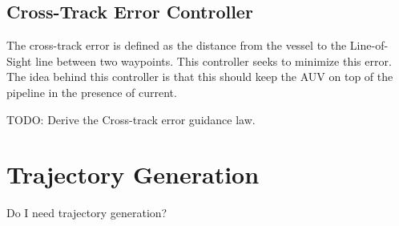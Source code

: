 	\subsection{Cross-Track Error Controller}
		The cross-track error is defined as the distance from the vessel to the Line-of-Sight line between two waypoints. This controller seeks to minimize this error. The idea behind this controller is that this should keep the AUV on top of the pipeline in the presence of current.
		
		TODO: Derive the Cross-track error guidance law. \cite{cross-track}
		
		
		
	
\section{Trajectory Generation}
	Do I need trajectory generation? 
	
